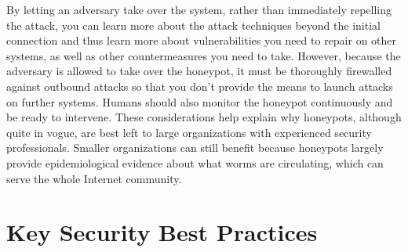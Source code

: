 By letting an adversary take over the system, rather than immediately
repelling the attack, you can learn more about the attack techniques
beyond the initial connection and thus learn more about
vulnerabilities you need to repair on other systems, as well as other
countermeasures you need to take.  However, because the adversary is
allowed to take over the honeypot, it must be thoroughly firewalled
against outbound attacks so that you don't provide the means to
launch attacks on further systems.  Humans should also monitor the
honeypot continuously and be ready to intervene.  These considerations
help explain why honeypots, although quite in vogue, are best left to
large organizations with experienced security professionals.  Smaller
organizations can still benefit because honeypots largely provide
epidemiological evidence about what worms are circulating, which can serve
the whole Internet community.

\section{Key Security Best
  Practices}\label{key-security-best-practices-section}

